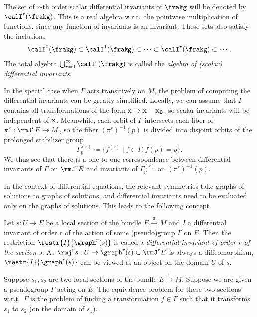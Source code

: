 The set of $r$-th order scalar differential invariants of $\frakg$ will be denoted by $\calI^r(\frakg)$. This is a real algebra w.r.t.\ the pointwise multiplication of functions, since any function of invariants is an invariant. These sets also satisfy the inclusions 
\[\calI^0(\frakg)\subset\calI^1(\frakg)\subset\cdots\subset\calI^r(\frakg)\subset\cdots.\]
The total algebra $\bigcup_{r=0}^\infty \calI^r(\frakg)$ is called the \emph{algebra of (scalar) differential invariants}.


\begin{rem}
    In the special case when $\Gamma$ acts transitively on $M$, the problem of computing the differential invariants can be greatly simplified. Locally, we can assume that $\Gamma$ contains all transformations of the form $\bf{x}\mapsto \bf{x}+\bf{x}_0$, so scalar invariants will be independent of $\bf{x}$. Meanwhile, each orbit of $\Gamma$ intersects each fiber of $\pi^r:\rmJ^r E\to M$, so the fiber $(\pi^r)^{-1}(p)$ is divided into disjoint orbits of the prolonged stabilizer group 
    \[\Gamma^{(r)}_p\coloneqq \{f^{(r)}\mid f\in\Gamma,f(p)=p\}.\]
    We thus see that there is a one-to-one correspondence between differential invariants of $\Gamma$ on $\rmJ^r E$ and invariants of $\Gamma^{(r)}_p$ on $(\pi^r)^{-1}(p)$. 
\end{rem}


In the context of differential equations, the relevant symmetries take graphs of solutions to graphs of solutions, and differential invariants need to be evaluated only on the graphs of solutions. This leads to the following concept.

\begin{defn}
    Let $s:U\to E$ be a local section of the bundle $E\overset{\pi}{\to}M$ and $I$ a differential invariant of order $r$ of the action of some (pseudo)group $\Gamma$ on $E$. Then the restriction $\restr{I}{\graph^{r}(s)}$ is called a \emph{differential invariant of order $r$ of the section $s$}. As $\rmj^r s:U\to \graph^{r}(s)\subset\rmJ^rE$ is always a diffeomorphism, $\restr{I}{\graph^{r}(s)}$ can be viewed as an object on the domain $U$ of $s$.
\end{defn}

\begin{defn}
    Suppose $s_1,s_2$ are two local sections of the bundle $E\overset{\pi}{\to}M$. Suppose we are given a pseudogroup $\Gamma$ acting on $E$. The equivalence problem for these two sections w.r.t.\ $\Gamma$ is the problem of finding a transformation $f\in\Gamma$ such that it transforms $s_1$ to $s_2$ (on the domain of $s_1$).
\end{defn}

